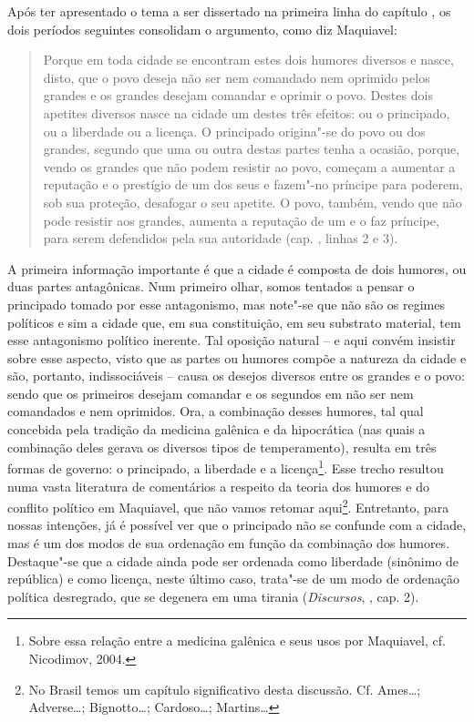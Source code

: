 Após ter apresentado o tema a ser dissertado na primeira linha do
capítulo , os dois períodos seguintes consolidam o argumento, como diz
Maquiavel:

\begin{quote}
Porque em toda cidade se encontram estes dois humores diversos e nasce,
disto, que o povo deseja não ser nem comandado nem oprimido pelos
grandes e os grandes desejam comandar e oprimir o povo. Destes dois
apetites diversos nasce na cidade um destes três efeitos: ou o
principado, ou a liberdade ou a licença. O principado origina"-se do povo
ou dos grandes, segundo que uma ou outra destas partes tenha a ocasião,
porque, vendo os grandes que não podem resistir ao povo, começam a
aumentar a reputação e o prestígio de um dos seus e fazem"-no príncipe
para poderem, sob sua proteção, desafogar o seu apetite. O povo, também,
vendo que não pode resistir aos grandes, aumenta a reputação de um e o
faz príncipe, para serem defendidos pela sua autoridade (cap. ,
linhas 2 e 3).
\end{quote}

A primeira informação importante é que a cidade é composta de dois
humores, ou duas partes antagônicas. Num primeiro olhar, somos tentados
a pensar o principado tomado por esse antagonismo, mas note"-se que não
são os regimes políticos e sim a cidade que, em sua constituição, em seu
substrato material, tem esse antagonismo político inerente. Tal oposição
natural -- e aqui convém insistir sobre esse aspecto, visto que as
partes ou humores compõe a natureza da cidade e são, portanto,
indissociáveis -- causa os desejos diversos entre os grandes e o povo:
sendo que os primeiros desejam comandar e os segundos em não ser nem
comandados e nem oprimidos. Ora, a combinação desses humores, tal qual
concebida pela tradição da medicina galênica e da hipocrática (nas quais
a combinação deles gerava os diversos tipos de temperamento), resulta em
três formas de governo: o principado, a liberdade e a licença\footnote{Sobre
  essa relação entre a medicina galênica e seus usos por Maquiavel, cf.
  Nicodimov, 2004.}. Esse trecho resultou numa vasta literatura de
comentários a respeito da teoria dos humores e do conflito político em
Maquiavel, que não vamos retomar aqui\footnote{No Brasil temos um
  capítulo significativo desta discussão. Cf. Ames\ldots{};
  Adverse\ldots{}; Bignotto\ldots{}; Cardoso\ldots{}; Martins\ldots{}}.
Entretanto, para nossas intenções, já é possível ver que o principado
não se confunde com a cidade, mas é um dos modos de sua ordenação em
função da combinação dos humores. Destaque"-se que a cidade ainda pode
ser ordenada como liberdade (sinônimo de república) e como licença,
neste último caso, trata"-se de um modo de ordenação política desregrado,
que se degenera em uma tirania (\emph{Discursos}, , cap. 2).


